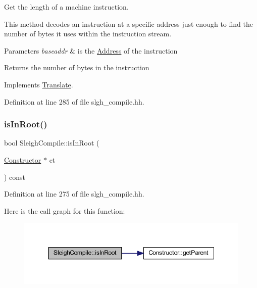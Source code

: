Get the length of a machine instruction. 

This method decodes an instruction at a specific address just enough to find the number of bytes it uses within the instruction stream. 
\begin{DoxyParams}{Parameters}
{\em baseaddr} & is the \mbox{\hyperlink{class_address}{Address}} of the instruction \\
\hline
\end{DoxyParams}
\begin{DoxyReturn}{Returns}
the number of bytes in the instruction 
\end{DoxyReturn}


Implements \mbox{\hyperlink{class_translate_aa7139376886fccfdcda529fc74f7b382}{Translate}}.



Definition at line 285 of file slgh\+\_\+compile.\+hh.

\mbox{\label{class_sleigh_compile_a2171aa9db2aaed657dd587ca5a098747}} 
\subsubsection{\texorpdfstring{isInRoot()}{isInRoot()}}
{\footnotesize\ttfamily bool Sleigh\+Compile\+::is\+In\+Root (\begin{DoxyParamCaption}\item[{\mbox{\hyperlink{class_constructor}{Constructor}} $\ast$}]{ct }\end{DoxyParamCaption}) const\hspace{0.3cm}{\ttfamily [inline]}}



Definition at line 275 of file slgh\+\_\+compile.\+hh.

Here is the call graph for this function\+:
\nopagebreak
\begin{figure}[H]
\begin{center}
\leavevmode
\includegraphics[width=350pt]{class_sleigh_compile_a2171aa9db2aaed657dd587ca5a098747_cgraph}
\end{center}
\end{figure}
\mbox{\label{class_sleigh_compile_a012c6e9fcecbbbaeea20a1e7cbe38e9d}} 
